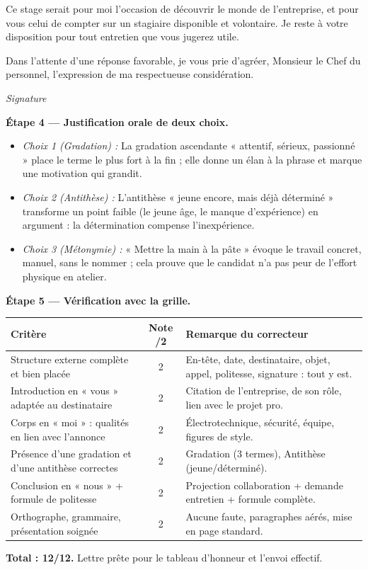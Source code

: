 \documentclass[11pt]{article}
\begin{document}
\begin{exoresolu}
\begin{exemplebox}
Ce stage serait pour moi l'occasion de découvrir le monde de l'entreprise, et pour vous celui de compter sur un stagiaire disponible et volontaire. Je reste à votre disposition pour tout entretien que vous jugerez utile.

Dans l'attente d'une réponse favorable, je vous prie d'agréer, Monsieur le Chef du personnel, l'expression de ma respectueuse considération.

\emph{Signature}
\end{exemplebox}

\textbf{Étape 4 --- Justification orale de deux choix.}
\begin{itemize}
\item \emph{Choix 1 (Gradation) :} La gradation ascendante « attentif, sérieux, passionné » place le terme le plus fort à la fin ; elle donne un élan à la phrase et marque une motivation qui grandit.
\item \emph{Choix 2 (Antithèse) :} L'antithèse « jeune encore, mais déjà déterminé » transforme un point faible (le jeune âge, le manque d'expérience) en argument : la détermination compense l'inexpérience.
\item \emph{Choix 3 (Métonymie) :} « Mettre la main à la pâte » évoque le travail concret, manuel, sans le nommer ; cela prouve que le candidat n'a pas peur de l'effort physique en atelier.
\end{itemize}

\textbf{Étape 5 --- Vérification avec la grille.}
\begin{center}
\begin{tabularx}{\linewidth}{|l|c|X|}
\hline
\rowcolor{popblueL} \textbf{Critère} & \textbf{Note /2} & \textbf{Remarque du correcteur} \\
\hline
Structure externe complète et bien placée & 2 & En-tête, date, destinataire, objet, appel, politesse, signature : tout y est. \\
\hline
Introduction en « vous » adaptée au destinataire & 2 & Citation de l'entreprise, de son rôle, lien avec le projet pro. \\
\hline
Corps en « moi » : qualités en lien avec l'annonce & 2 & Électrotechnique, sécurité, équipe, figures de style. \\
\hline
Présence d'une gradation et d'une antithèse correctes & 2 & Gradation (3 termes), Antithèse (jeune/déterminé). \\
\hline
Conclusion en « nous » + formule de politesse & 2 & Projection collaboration + demande entretien + formule complète. \\
\hline
Orthographe, grammaire, présentation soignée & 2 & Aucune faute, paragraphes aérés, mise en page standard. \\
\hline
\end{tabularx}
\end{center}
\textbf{Total : 12/12.} Lettre prête pour le tableau d'honneur et l'envoi effectif.
\end{exoresolu}
\end{document}
